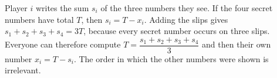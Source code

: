 Player $i$ writes the sum $s_i$ of the three numbers they see. If the four secret numbers have total $T$, then $s_i=T-x_i$. Adding the slips gives $s_1+s_2+s_3+s_4=3T$, because every secret number occurs on three slips. Everyone can therefore compute $T=\dfrac{s_1+s_2+s_3+s_4}{3}$ and then their own number $\boxed{x_i=T-s_i}$. The order in which the other numbers were shown is irrelevant.
